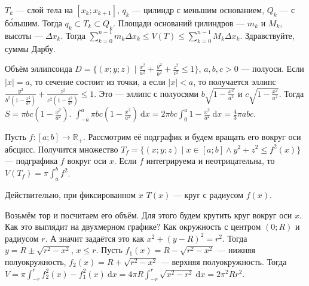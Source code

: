 \documentclass{article}
\begin{document}
\begin{itemize}
\begin{Proof}
\begin{center}
            \end{center}
            $T_k$ --- слой тела на $[x_k;x_{k+1}]$, $q_k$ --- цилиндр с меньшим основанием, $Q_k$ --- с б\'{о}льшим. Тогда $q_k\subset T_k\subset Q_k$. Площади оснований цилиндров --- $m_k$ и $M_k$, высоты --- $\Delta x_k$. Тогда $\sum\limits_{k=0}^{n-1}m_k\Delta x_k\leqslant V(T)\leqslant\sum\limits_{k=0}^{n-1}M_k\Delta x_k$. Здравствуйте, суммы Дарбу.
        \end{Proof}
        \begin{Example}
            Объём эллипсоида $D=\{(x;y;z)\mid\frac{x^2}{a^2}+\frac{y^2}{b^2}+\frac{z^2}{c^2}\leqslant1\}$, $a,b,c>0$ --- полуоси. Если $|x|=a$, то сечение состоит из точки, а если $|x|<a$, то получается эллипс $\frac{y^2}{b^2\left(1-\frac{x^2}{a^2}\right)}+\frac{z^2}{c^2\left(1-\frac{x^2}{a^2}\right)}\leqslant1$. Это --- эллипс с полуосями $b\sqrt{1-\frac{x^2}{a^2}}$ и $c\sqrt{1-\frac{x^2}{a^2}}$. Тогда $S=\pi bc\left(1-\frac{x^2}{a^2}\right)$. $\int_{-a}^a\pi bc\left(1-\frac{x^2}{a^2}\right)~\mathrm dx=2\pi bc\int_0^a1-\frac{x^2}{a^2}~\mathrm dx=\frac43\pi abc$.
        \end{Example}
        \dfn Пусть $f\colon[a;b]\to\mathbb R_+$. Рассмотрим её подграфик и будем вращать его вокруг оси абсцисс. Получится множество $T_f=\{(x;y;z)\mid x\in[a;b]\land y^2+z^2\leqslant f^2(x)\}$ ---  подграфика $f$ вокруг оси $x$.
        \thm Если $f$ интегрируема и неотрицательна, то $V(T_f)=\pi\int_a^bf^2$.
        \begin{Proof}
            Действительно, при фиксированном $x$ $T(x)$ --- круг с радиусом $f(x)$.
        \end{Proof}
        \begin{Example}
            Возьмём тор и посчитаем его объём. Для этого будем крутить круг вокруг оси $x$. Как это выглядит на двухмерном графике? Как окружность с центром $(0;R)$ и радиусом $r$. А значит задаётся это как $x^2+(y-R)^2=r^2$. Тогда $y=R\pm\sqrt{r^2-x^2}$, $x\leqslant r$. Пусть $f_1(x)=R-\sqrt{r^2-x^2}$ --- нижняя полуокружность, $f_2(x)=R+\sqrt{r^2-x^2}$ --- верхняя полуокружность. Тогда $V=\pi\int_{-r}^rf_2^2(x)-f_1^2(x)~\mathrm dx=4\pi R\int_{-r}^r\sqrt{x^2-r^2}~\mathrm dx=2\pi^2Rr^2$.

\end{Example}
\end{itemize}
\end{document}
